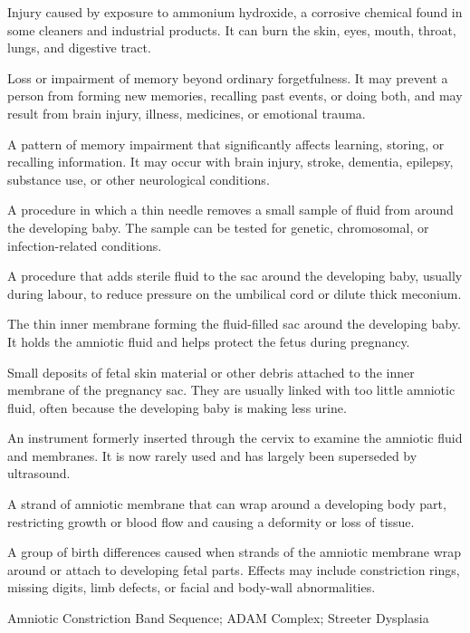 Injury caused by exposure to ammonium hydroxide, a corrosive chemical found in some cleaners and industrial products. It can burn the skin, eyes, mouth, throat, lungs, and digestive tract.

 Loss or impairment of memory beyond ordinary forgetfulness. It may prevent a person from forming new memories, recalling past events, or doing both, and may result from brain injury, illness, medicines, or emotional trauma.

 A pattern of memory impairment that significantly affects learning, storing, or recalling information. It may occur with brain injury, stroke, dementia, epilepsy, substance use, or other neurological conditions.

 A procedure in which a thin needle removes a small sample of fluid from around the developing baby. The sample can be tested for genetic, chromosomal, or infection-related conditions.

 A procedure that adds sterile fluid to the sac around the developing baby, usually during labour, to reduce pressure on the umbilical cord or dilute thick meconium.

 The thin inner membrane forming the fluid-filled sac around the developing baby. It holds the amniotic fluid and helps protect the fetus during pregnancy.

 Small deposits of fetal skin material or other debris attached to the inner membrane of the pregnancy sac. They are usually linked with too little amniotic fluid, often because the developing baby is making less urine.

 An instrument formerly inserted through the cervix to examine the amniotic fluid and membranes. It is now rarely used and has largely been superseded by ultrasound.

 A strand of amniotic membrane that can wrap around a developing body part, restricting growth or blood flow and causing a deformity or loss of tissue.

 A group of birth differences caused when strands of the amniotic membrane wrap around or attach to developing fetal parts. Effects may include constriction rings, missing digits, limb defects, or facial and body-wall abnormalities.

\synonyms
Amniotic Constriction Band Sequence; ADAM Complex; Streeter Dysplasia


